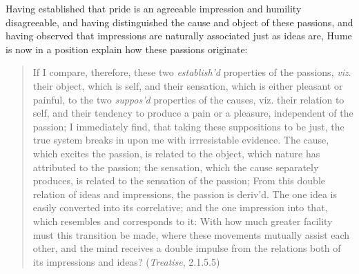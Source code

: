 
Having established that pride is an agreeable impression and humility disagreeable, and having distinguished the cause and object of these passions, and having observed that impressions are naturally associated just as ideas are, Hume is now in a position explain how these passions originate:

\begin{quote}
    If I compare, therefore, these two \emph{establish'd} properties of the passions, \emph{viz}. their object, which is self, and their sensation, which is either pleasant or painful, to the two \emph{suppos'd} properties of the causes, viz. their relation to self, and their tendency to produce a pain or a pleasure, independent of the passion; I immediately find, that taking these suppositions to be just, the true system breaks in upon me with irrresistable evidence. The cause, which excites the passion, is related to the object, which nature has attributed to the passion; the sensation, which the cause separately produces, is related to the sensation of the passion; From this double relation of ideas and impressions, the passion is deriv'd. The one idea is easily converted into its correlative; and the one impression into that, which resembles and corresponds to it: With how much greater facility must this transition be made, where these movements mutually assist each other, and the mind receives a double impulse from the relations both of its impressions and ideas? (\emph{Treatise}, 2.1.5.5)
\end{quote}


